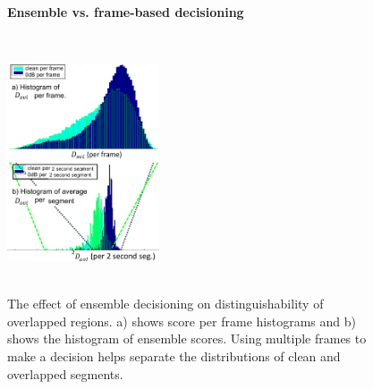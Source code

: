 {\begin{figure}[h!]
	\centering
	\vspace{0mm}
	\textbf{Ensemble vs. frame-based decisioning}\par\medskip	
	\includegraphics[height = 3in, width=0.4\textwidth]{figures/compare_pframe_pseg_hists}
	\vspace{-1mm}
	\caption{ The effect of ensemble decisioning on distinguishability of overlapped regions. a) shows score per frame histograms and b) shows the histogram of ensemble scores. Using multiple frames to make a decision helps separate the distributions of clean and overlapped segments.}
	\vspace{-2mm}
	\label{fig:ch2_compare_perframe_and_perfile_ovldethist}
\end{figure}

}
